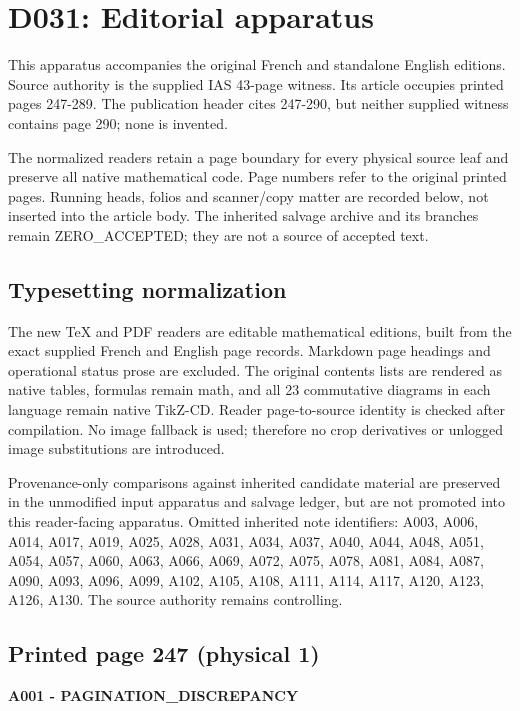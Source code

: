 \documentclass[10pt,a4paper]{article}
\begin{document}
\section{D031: Editorial apparatus}

This apparatus accompanies the original French and standalone English editions. Source authority is the supplied IAS 43-page witness. Its article occupies printed pages 247-289. The publication header cites 247-290, but neither supplied witness contains page 290; none is invented.

The normalized readers retain a page boundary for every physical source leaf and preserve all native mathematical code. Page numbers refer to the original printed pages. Running heads, folios and scanner/copy matter are recorded below, not inserted into the article body. The inherited salvage archive and its branches remain ZERO\_ACCEPTED; they are not a source of accepted text.

\subsection{Typesetting normalization}

The new TeX and PDF readers are editable mathematical editions, built from the exact supplied French and English page records. Markdown page headings and operational status prose are excluded. The original contents lists are rendered as native tables, formulas remain math, and all 23 commutative diagrams in each language remain native TikZ-CD. Reader page-to-source identity is checked after compilation. No image fallback is used; therefore no crop derivatives or unlogged image substitutions are introduced.

Provenance-only comparisons against inherited candidate material are preserved in the unmodified input apparatus and salvage ledger, but are not promoted into this reader-facing apparatus. Omitted inherited note identifiers: A003, A006, A014, A017, A019, A025, A028, A031, A034, A037, A040, A044, A048, A051, A054, A057, A060, A063, A066, A069, A072, A075, A078, A081, A084, A087, A090, A093, A096, A099, A102, A105, A108, A111, A114, A117, A120, A123, A126, A130. The source authority remains controlling.

\subsection{Printed page 247 (physical 1)}

\textbf{A001 - PAGINATION\_DISCREPANCY}
\end{document}
